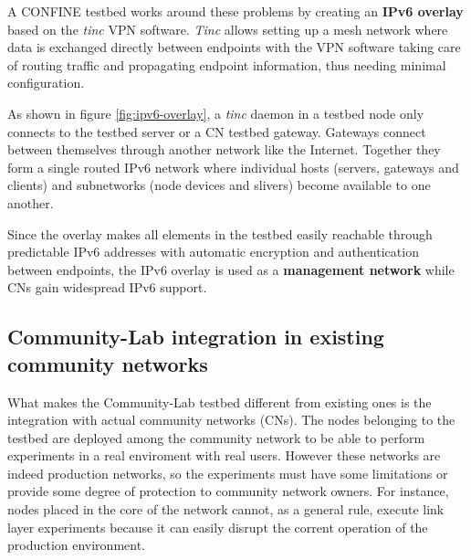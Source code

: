 \documentclass[conference]{IEEEtran}
\begin{document}
A CONFINE testbed works around these problems by creating an \textbf{IPv6
  overlay} based on the \emph{tinc} \cite{tinc} VPN software.  \emph{Tinc}
allows setting up a mesh network where data is exchanged directly between
endpoints with the VPN software taking care of routing traffic and propagating
endpoint information, thus needing minimal configuration.

As shown in figure \ref{fig:ipv6-overlay}, a \emph{tinc} daemon in a testbed
node only connects to the testbed server or a CN testbed gateway.  Gateways
connect between themselves through another network like the Internet.
Together they form a single routed IPv6 network where individual hosts
(servers, gateways and clients) and subnetworks (node devices and slivers)
become available to one another.

Since the overlay makes all elements in the testbed easily reachable through
predictable IPv6 addresses with automatic encryption and authentication
between endpoints, the IPv6 overlay is used as a \textbf{management network}
while CNs gain widespread IPv6 support.






\subsection{Community-Lab integration in existing community networks}

What makes the Community-Lab testbed different from existing ones is the integration
with actual community networks (CNs). The nodes belonging to the testbed are deployed among the 
community network to be able to perform experiments in a real enviroment with real users. However 
these networks are indeed production networks, so the experiments must have some limitations or provide some
degree of protection to community network owners. For instance, nodes placed in the core of the network
cannot, as a general rule, execute link layer experiments because it can easily disrupt the corrent
operation of the production environment.




\end{document}
